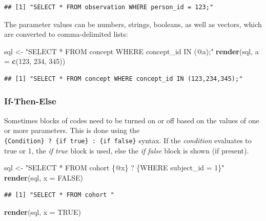 \documentclass[11pt]{book}
\newenvironment{Shaded}{\begin{snugshade}}{\end{snugshade}}
\newcommand{\KeywordTok}[1]{\textcolor[rgb]{0.13,0.29,0.53}{\textbf{#1}}}
\newcommand{\DataTypeTok}[1]{\textcolor[rgb]{0.13,0.29,0.53}{#1}}
\newcommand{\DecValTok}[1]{\textcolor[rgb]{0.00,0.00,0.81}{#1}}
\newcommand{\StringTok}[1]{\textcolor[rgb]{0.31,0.60,0.02}{#1}}
\newcommand{\OtherTok}[1]{\textcolor[rgb]{0.56,0.35,0.01}{#1}}
\newcommand{\NormalTok}[1]{#1}
\theoremstyle{definition}
\theoremstyle{definition}
\theoremstyle{definition}
\theoremstyle{remark}
\begin{document}
\begin{verbatim}
## [1] "SELECT * FROM observation WHERE person_id = 123;"
\end{verbatim}

The parameter values can be numbers, strings, booleans, as well as
vectors, which are converted to comma-delimited lists:

\begin{Shaded}
\begin{Highlighting}[]
\NormalTok{sql <-}\StringTok{ "SELECT * FROM concept WHERE concept_id IN (@a);"}
\KeywordTok{render}\NormalTok{(sql, }\DataTypeTok{a =} \KeywordTok{c}\NormalTok{(}\DecValTok{123}\NormalTok{, }\DecValTok{234}\NormalTok{, }\DecValTok{345}\NormalTok{))}
\end{Highlighting}
\end{Shaded}

\begin{verbatim}
## [1] "SELECT * FROM concept WHERE concept_id IN (123,234,345);"
\end{verbatim}

\subsubsection*{If-Then-Else}\label{if-then-else}

Sometimes blocks of codes need to be turned on or off based on the
values of one or more parameters. This is done using the
\texttt{\{Condition\}\ ?\ \{if\ true\}\ :\ \{if\ false\}} syntax. If the
\emph{condition} evaluates to true or 1, the \emph{if true} block is
used, else the \emph{if false} block is shown (if present).

\begin{Shaded}
\begin{Highlighting}[]
\NormalTok{sql <-}\StringTok{ "SELECT * FROM cohort \{@x\} ? \{WHERE subject_id = 1\}"}
\KeywordTok{render}\NormalTok{(sql, }\DataTypeTok{x =} \OtherTok{FALSE}\NormalTok{)}
\end{Highlighting}
\end{Shaded}

\begin{verbatim}
## [1] "SELECT * FROM cohort "
\end{verbatim}

\begin{Shaded}
\begin{Highlighting}[]
\KeywordTok{render}\NormalTok{(sql, }\DataTypeTok{x =} \OtherTok{TRUE}\NormalTok{)}
\end{Highlighting}
\end{Shaded}
\end{document}
